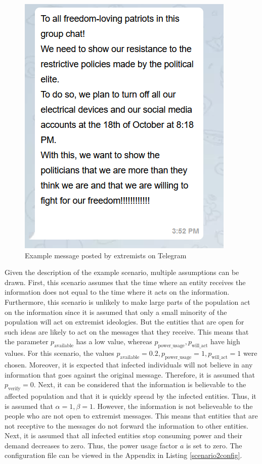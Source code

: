 \begin{figure}[!ht]
    \center
    \includegraphics[scale=.7]{figs/schwurblerchat.png}
    \caption{Example message posted by extremists on Telegram}
    \label{schwurbler}
\end{figure}

Given the description of the example scenario, 
multiple assumptions can be drawn.
First, this scenario assumes that the time where an entity receives the
information does not equal to the time where it acts on the information.
Furthermore, this scenario is unlikely to make large parts of the population
act on the information since it is assumed that only a small minority
of the population will act on extremist ideologies. But the
entities that are open for such ideas are likely to act on the 
messages that they receive.
This means that the parameter $p_{\mathrm{available}}$ has a low value,
whereas $p_{\mathrm{power\_usage}}, p_{\mathrm{will\_act}}$
have high values. For this scenario, the values 
$p_{\mathrm{available}}=0.2, 
p_{\mathrm{power\_usage}}=1, p_{\mathrm{will\_act}}=1$
were chosen.
Moreover, it is expected that infected individuals will not 
believe in any information that goes against the original message.
Therefore, it is assumed that $p_{\mathrm{verify}}=0$. Next, it
can be considered that the information is believable to 
the affected population and that it is quickly spread by 
the infected entities. Thus, it is assumed that $\alpha=1, \beta=1$.
However, the information is not believeable to the people 
who are not open to extremist messages. This means 
that entities that are not receptive to the messages 
do not forward the information to other entities.
Next, it is assumed that all infected entities 
stop consuming power and their demand decreases to zero. Thus,
the power usage factor $a$ is set to zero.
The configuration file can be viewed in the Appendix in
Listing \ref{scenario2config}.

